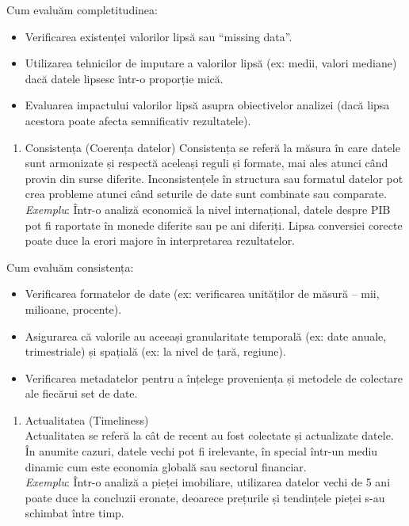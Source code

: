 \documentclass[
  11pt,
  b5paper,
  nottoc]{book}
\providecommand{\tightlist}{%
  \setlength{\itemsep}{0pt}\setlength{\parskip}{0pt}}\usepackage{longtable,booktabs,array}
\begin{document}
Cum evaluăm completitudinea:

\begin{itemize}
\tightlist
\item
  Verificarea existenței valorilor lipsă sau ``missing data''.\\
\item
  Utilizarea tehnicilor de imputare a valorilor lipsă (ex: medii, valori
  mediane) dacă datele lipsesc într-o proporție mică.\\
\item
  Evaluarea impactului valorilor lipsă asupra obiectivelor analizei
  (dacă lipsa acestora poate afecta semnificativ rezultatele).
\end{itemize}

\begin{enumerate}
\def\labelenumi{\arabic{enumi}.}
\setcounter{enumi}{2}
\tightlist
\item
  Consistența (Coerența datelor) Consistența se referă la măsura în care
  datele sunt armonizate și respectă aceleași reguli și formate, mai
  ales atunci când provin din surse diferite. Inconsistențele în
  structura sau formatul datelor pot crea probleme atunci când seturile
  de date sunt combinate sau comparate.\\
  \emph{Exemplu}: Într-o analiză economică la nivel internațional,
  datele despre PIB pot fi raportate în monede diferite sau pe ani
  diferiți. Lipsa conversiei corecte poate duce la erori majore în
  interpretarea rezultatelor.
\end{enumerate}

Cum evaluăm consistența:

\begin{itemize}
\tightlist
\item
  Verificarea formatelor de date (ex: verificarea unităților de măsură
  -- mii, milioane, procente).
\item
  Asigurarea că valorile au aceeași granularitate temporală (ex: date
  anuale, trimestriale) și spațială (ex: la nivel de țară, regiune).\\
\item
  Verificarea metadatelor pentru a înțelege proveniența și metodele de
  colectare ale fiecărui set de date.
\end{itemize}

\begin{enumerate}
\def\labelenumi{\arabic{enumi}.}
\setcounter{enumi}{3}
\tightlist
\item
  Actualitatea (Timeliness)\\
  Actualitatea se referă la cât de recent au fost colectate și
  actualizate datele. În anumite cazuri, datele vechi pot fi irelevante,
  în special într-un mediu dinamic cum este economia globală sau
  sectorul financiar.\\
  \emph{Exemplu}: Într-o analiză a pieței imobiliare, utilizarea datelor
  vechi de 5 ani poate duce la concluzii eronate, deoarece prețurile și
  tendințele pieței s-au schimbat între timp.
\end{enumerate}
\end{document}
